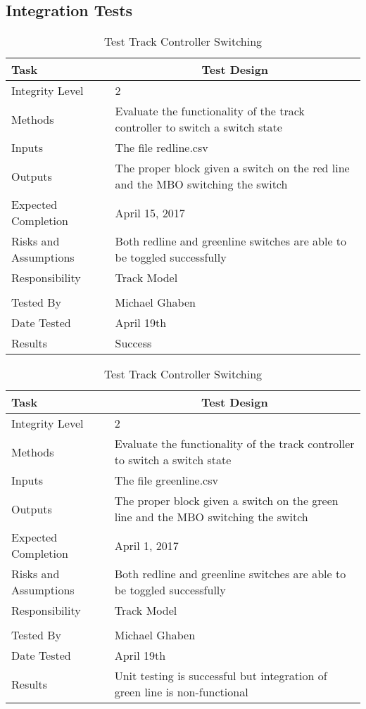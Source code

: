 \documentclass[]{article}
\begin{document}
\subsection{Integration Tests}

\begin{table}[H]
	\centering
	\caption{Test Track Controller Switching}
	\begin{tabular}{|l|l|}
		\hline
		Task & \multicolumn{1}{c|}{Test Design} \\ \hline
		Integrity Level & 2 \\ \hline
		Methods & Evaluate the functionality of the track controller to switch a switch state \\ \hline
		Inputs &  The file redline.csv \\ \hline
		Outputs &  \parbox[t]{10cm}{The proper block given a switch on the red line and the MBO switching the switch}\\ \hline
		Expected Completion & April 15, 2017\\ \hline
		Risks and Assumptions & Both redline and greenline switches are able to be toggled successfully \\ \hline
		Responsibility & Track Model\\ \hline
		\\ \hline
		Tested By   &  Michael Ghaben\\	\hline
		Date Tested & \parbox[t]{10cm}{April 19th}\\ \hline
		Results & Success\\ \hline

	\end{tabular}
\end{table}

\begin{table}[H]
	\centering
	\caption{Test Track Controller Switching}
	\begin{tabular}{|l|l|}
		\hline
		Task & \multicolumn{1}{c|}{Test Design} \\ \hline
		Integrity Level & 2 \\ \hline
		Methods & Evaluate the functionality of the track controller to switch a switch state \\ \hline
		Inputs &  The file greenline.csv \\ \hline
		Outputs &  \parbox[t]{10cm}{The proper block given a switch on the green line and the MBO switching the switch}\\ \hline
		Expected Completion & April 1, 2017\\ \hline
		Risks and Assumptions & Both redline and greenline switches are able to be toggled successfully \\ \hline
		Responsibility & Track Model\\ \hline
		\\ \hline
		Tested By   &  Michael Ghaben\\	\hline
		Date Tested & \parbox[t]{10cm}{April 19th}\\ \hline
		Results & \parbox[t]{10cm}{Unit testing is successful but integration of green line is non-functional}\\ \hline
	\end{tabular}
\end{table}
\end{document}
